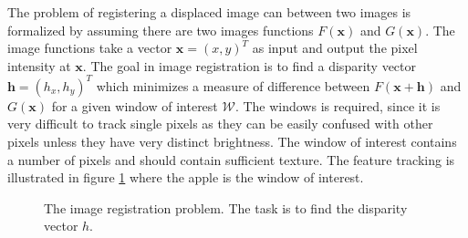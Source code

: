\documentclass[11pt,a4paper,twoside]{report}
\begin{document}
The problem of registering a displaced image can between two images is
formalized by assuming there are two images functions $F(\mathbf{x})$ and $G(\mathbf{x})$. The image
functions take a vector $\mathbf{x} = (x,y)^T$ as input
and output the pixel intensity at $\mathbf{x}$. The goal in image registration
is to find a disparity vector $\mathbf{h} = (h_x,h_y)^T$ which minimizes
a measure of difference between $F(\mathbf{x + h})$ and $G(\mathbf{x})$ for a given window of
interest $\mathcal{W}$. The windows is required, since it is very difficult to
track single pixels as they can be easily confused with other pixels unless they
have very distinct brightness. The window of interest contains a number of
pixels and should contain sufficient texture. The feature tracking is
illustrated in figure \ref{fg:apple} where the apple is the window of interest.

\begin{figure}[H] 
\centering
\setlength\fboxsep{0.5pt}
\setlength\fboxrule{0.5pt}
\label{fg:apple}
\caption{ The image registration problem. The task is to find the disparity
  vector $h$.}
\end{figure}
\end{document}
